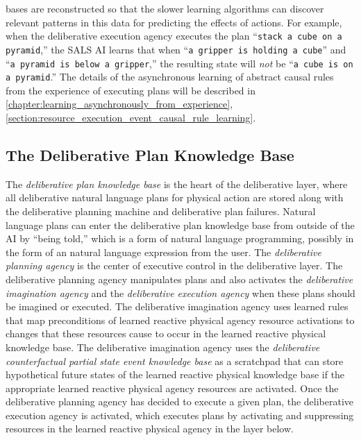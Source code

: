 \begin{enumerate}[~~A.]
  bases are reconstructed so that the slower learning algorithms can
  discover relevant patterns in this data for predicting the effects
  of actions.  For example, when the deliberative execution agency
  executes the plan ``{\tt{stack a cube on a pyramid}},'' the SALS AI
  learns that when ``{\tt{a gripper is holding a cube}}'' and ``{\tt{a
      pyramid is below a gripper}},'' the resulting state will
  {\emph{not}} be ``{\tt{a cube is on a pyramid}}.''  The details of
  the asynchronous learning of abstract causal rules from the
  experience of executing plans will be described in
  {\mbox{\autoref{chapter:learning_asynchronously_from_experience}}},
  {\mbox{\autoref{section:resource_execution_event_causal_rule_learning}}}.
\end{enumerate}

\subsection{The Deliberative Plan Knowledge Base}
\label{section:the_deliberative_plan_knowledge_base}

The {\emph{deliberative plan knowledge base}} is the heart of the
deliberative layer, where all deliberative natural language plans for
physical action are stored along with the deliberative planning
machine and deliberative plan failures.  Natural language plans can
enter the deliberative plan knowledge base from outside of the AI by
``being told,'' which is a form of natural language programming,
possibly in the form of an natural language expression from the user.
The {\emph{deliberative planning agency}} is the center of executive
control in the deliberative layer.  The deliberative planning agency
manipulates plans and also activates the {\emph{deliberative
    imagination agency}} and the {\emph{deliberative execution
    agency}} when these plans should be imagined or executed.  The
deliberative imagination agency uses learned rules that map
preconditions of learned reactive physical agency resource activations
to changes that these resources cause to occur in the learned reactive
physical knowledge base.  The deliberative imagination agency uses the
{\emph{deliberative counterfactual partial state event knowledge
    base}} as a scratchpad that can store hypothetical future states
of the learned reactive physical knowledge base if the appropriate
learned reactive physical agency resources are activated.  Once the
deliberative planning agency has decided to execute a given plan, the
deliberative execution agency is activated, which executes plans by
activating and suppressing resources in the learned reactive physical
agency in the layer below.

